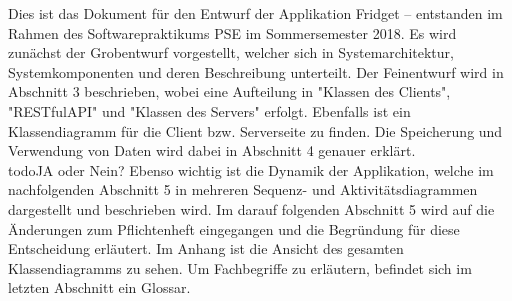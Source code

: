 Dies ist das Dokument für den Entwurf der Applikation Fridget – entstanden im Rahmen des Softwarepraktikums PSE im Sommersemester 2018.
Es wird zunächst der Grobentwurf vorgestellt, welcher sich in Systemarchitektur, Systemkomponenten und deren Beschreibung unterteilt. 
Der Feinentwurf wird in Abschnitt 3 beschrieben, wobei eine Aufteilung in "Klassen des Clients", "RESTfulAPI" und "Klassen des Servers" erfolgt. Ebenfalls ist ein Klassendiagramm für die Client bzw. Serverseite zu finden. 
Die Speicherung und Verwendung von Daten wird dabei in Abschnitt 4 genauer erklärt. \\todo{JA oder Nein?} 
Ebenso wichtig ist die Dynamik der Applikation, welche im nachfolgenden Abschnitt 5 in mehreren Sequenz- und Aktivitätsdiagrammen dargestellt und beschrieben wird.  
Im darauf folgenden Abschnitt 5 wird auf die Änderungen zum Pflichtenheft eingegangen und die Begründung für diese Entscheidung erläutert.
Im Anhang ist die Ansicht des gesamten Klassendiagramms zu sehen.
Um Fachbegriffe zu erläutern, befindet sich im letzten Abschnitt ein Glossar.